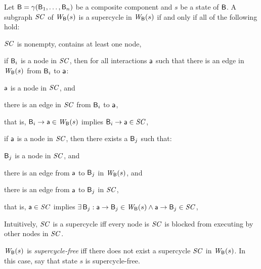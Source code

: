 \begin{definition}[Supercycle]
\label{def:supercycle} 
\label{defn:supercycle} 
Let $\mathsf{B} = \gamma(\mathsf{B}_1,\dots,\mathsf{B}_n)$ be a composite component and $s$ be a state of $\mathsf{B}$.
A subgraph $\mathit{SC}$ of $\mathit{W}_{\mathsf{B}}({s})$ is a supercycle in $\mathit{W}_{\mathsf{B}}({s})$ if and only if all of the following hold:
\begin{nlst1}
   \item \label{def:supercycle.nonempty} \label{clause:supercycle.nonempty} 
$\mathit{SC}$ is nonempty, \ie contains at least one node,

   \item \label{def:supercycle.component-blocked} \label{clause:supercycle.component-blocked} 
if $\mathsf{B}_i$ is a node in $\mathit{SC}$, then for all interactions $\mathsf{a}$ such that
there is an edge in $\mathit{W}_{\mathsf{B}}({s})$ from $\mathsf{B}_i$ to $\mathsf{a}$:
      \begin{nlst2}
      \item $\mathsf{a}$ is a node in $\mathit{SC}$, and 
      \item there is an edge in $\mathit{SC}$ from $\mathsf{B}_i$ to $\mathsf{a}$,
      \end{nlst2}
that is, $\mathsf{B}_i \rightarrow \mathsf{a} \in \mathit{W}_{\mathsf{B}}({s})$ implies $\mathsf{B}_i \rightarrow \mathsf{a} \in \mathit{SC}$,

   \item \label{def:supercycle.action-blocked}  \label{clause:supercycle.action-blocked}  
if $\mathsf{a}$ is a node in $\mathit{SC}$, then there exists a $\mathsf{B}_j$ such that:
      \begin{nlst2}
      \item $\mathsf{B}_j$  is a node in $\mathit{SC}$, and
      \item there is an edge from $\mathsf{a}$ to $\mathsf{B}_j$ in $\mathit{W}_{\mathsf{B}}({s})$, and
      \item there is an edge from $\mathsf{a}$ to $\mathsf{B}_j$ in $\mathit{SC}$,
      \end{nlst2}
that is, $\mathsf{a} \in \mathit{SC}$ implies $\exists\, \mathsf{B}_j : \mathsf{a} \rightarrow \mathsf{B}_j \in \mathit{W}_{\mathsf{B}}({s}) \land \mathsf{a} \rightarrow \mathsf{B}_j \in \mathit{SC}$,

\end{nlst1}
\end{definition}
Intuitively, $\mathit{SC}$ is a supercycle iff every node is $\mathit{SC}$ is blocked from executing by other nodes in $\mathit{SC}$. 

\begin{definition}
\label{def:supercycle-free}
\label{defn:supercycle-free}
$\mathit{W}_{\mathsf{B}}({s})$ is \emph{supercycle-free} iff 
there does not exist a supercycle $\mathit{SC}$ in $\mathit{W}_{\mathsf{B}}({s})$. 
In this case, say that state $s$ is supercycle-free.
\end{definition}

